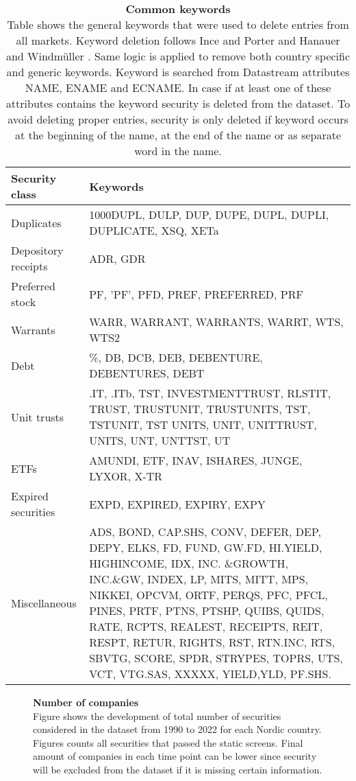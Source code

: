 \documentclass{article}
\begin{document}
\begin{table}[ht] 
\small
\caption[Common keywords]{\textbf{Common keywords}\\ Table shows the general keywords that were used to delete entries from all markets. Keyword deletion follows Ince and Porter \protect\citeyear{Ince2006} and Hanauer and Windmüller \protect\citeyear{HANAUER2023106712}. Same logic is applied to remove both country specific and generic keywords. Keyword is searched from Datastream attributes NAME, ENAME and ECNAME. In case if at least one of these attributes contains the keyword security is deleted from the dataset. To avoid deleting proper entries, security is only deleted if keyword occurs at the beginning of the name, at the end of the name or as separate word in the name.}
 \label{table:generalKeywords}
\centering
\begin{tabularx}{\textwidth}{l X}
\toprule
Security class 	& Keywords \\
\midrule
Duplicates 		& 1000DUPL, DULP, DUP, DUPE, DUPL, DUPLI, DUPLICATE, XSQ, XETa  \\[1ex]
Depository receipts	& ADR, GDR \\[1ex]
Preferred stock 	&  PF, ’PF’, PFD, PREF, PREFERRED, PRF\\ [1ex]
Warrants 			&  WARR, WARRANT, WARRANTS, WARRT, WTS, WTS2\\[1ex]
Debt 			& \%, DB, DCB, DEB, DEBENTURE, DEBENTURES, DEBT\\[1ex]
Unit trusts 		& .IT, .ITb, TST, INVESTMENTTRUST, RLSTIT, TRUST, TRUSTUNIT, TRUSTUNITS, TST, TSTUNIT, TST UNITS, UNIT, UNITTRUST, UNITS, UNT, UNTTST, UT\\[1ex]
ETFs 			& AMUNDI, ETF, INAV, ISHARES, JUNGE, LYXOR, X-TR\\[1ex]
Expired securities 	& EXPD, EXPIRED, EXPIRY, EXPY\\[1ex]
Miscellaneous 		& ADS, BOND, CAP.SHS, CONV, DEFER, DEP, DEPY, ELKS, FD, FUND, GW.FD, HI.YIELD, HIGHINCOME, IDX, INC.								\&GROWTH, INC.\&GW, INDEX, LP, MITS, MITT, MPS, NIKKEI, OPCVM, ORTF, PERQS, 												PFC, PFCL, PINES, PRTF, PTNS, PTSHP, QUIBS, QUIDS, RATE, RCPTS, REALEST, RECEIPTS, REIT, RESPT, 								RETUR, RIGHTS, RST, RTN.INC, RTS, SBVTG, SCORE, SPDR, STRYPES, TOPRS, UTS, VCT, VTG.SAS, 									XXXXX, YIELD,YLD, PF.SHS.\\
 \bottomrule
 \end{tabularx}
 \end{table} 

\begin{figure}[ht]
\centering
\caption[Number of companies]{\textbf{Number of companies}\\ Figure shows the development of total number of securities considered in the dataset from 1990 to 2022 for each Nordic country. Figures counts all securities that passed the static screens. Final amount of companies in each time point can be lower since security will be excluded from the dataset if it is missing certain information.}

\label{plot:number_of_companies}
\end{figure}
\end{document}
